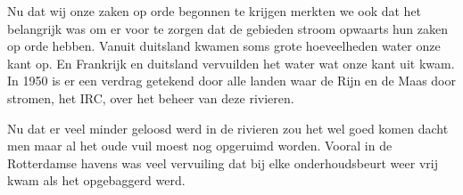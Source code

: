 Nu dat wij onze zaken op orde begonnen te krijgen merkten we ook dat het belangrijk was om er voor te zorgen dat de gebieden stroom opwaarts hun zaken op orde hebben.
Vanuit duitsland kwamen soms grote hoeveelheden water onze kant op.
En Frankrijk en duitsland vervuilden het water wat onze kant uit kwam.
In 1950 is er een verdrag getekend door alle landen waar de Rijn en de Maas door stromen, het IRC, over het beheer van deze rivieren.

Nu dat er veel minder geloosd werd in de rivieren zou het wel goed komen dacht men maar al het oude vuil moest nog opgeruimd worden. 
Vooral in de Rotterdamse havens was veel vervuiling dat bij elke onderhoudsbeurt weer vrij kwam als het opgebaggerd werd.



